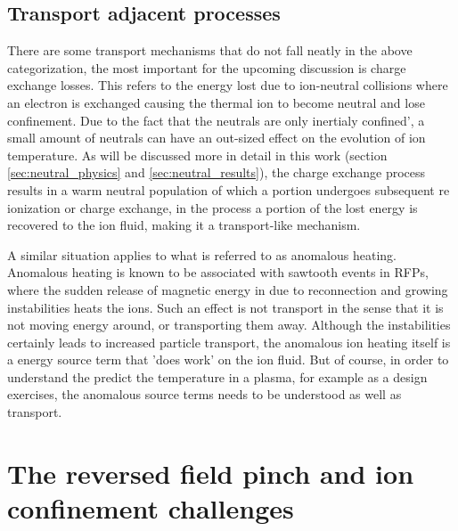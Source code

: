 \begin{refsection}
\subsection{Transport adjacent processes}

There are some transport mechanisms that do not fall neatly in the above categorization, the most important for the upcoming discussion is charge exchange losses. This refers to the energy lost due to ion-neutral collisions where an electron is exchanged causing the thermal ion to become neutral and lose confinement. Due to the fact that the neutrals are only inertialy confined', a small amount of neutrals can have an out-sized effect on the evolution of ion temperature. As will be discussed more in detail in this work (section \ref{sec:neutral_physics} and \ref{sec:neutral_results}), the charge exchange process results in a warm neutral population of which a portion undergoes subsequent re ionization or charge exchange, in the process a portion of the lost energy is recovered to the ion fluid, making it a transport-like mechanism.

A similar situation applies to what is referred to as anomalous heating. Anomalous heating is known to be associated with sawtooth events in RFPs, where the sudden release of magnetic energy in due to reconnection and growing instabilities heats the ions. Such an effect is not transport in the sense that it is not moving energy around, or transporting them away. Although the instabilities certainly leads to increased particle transport, the anomalous ion heating itself is a energy source term that 'does work' on the ion fluid. But of course, in order to understand the predict the temperature in a plasma, for example as a design exercises, the anomalous source terms needs to be understood as well as transport. 

\section{The reversed field pinch and ion confinement challenges}


\end{refsection}
